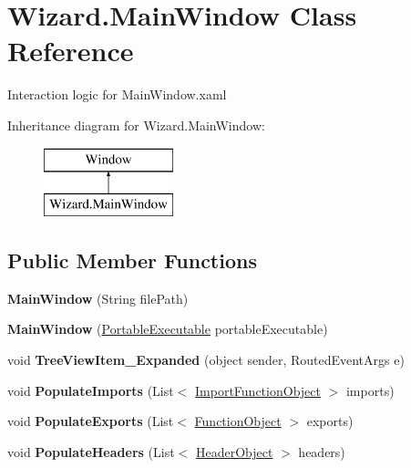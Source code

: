 \hypertarget{class_wizard_1_1_main_window}{}\section{Wizard.\+Main\+Window Class Reference}
\label{class_wizard_1_1_main_window}


Interaction logic for Main\+Window.\+xaml  


Inheritance diagram for Wizard.\+Main\+Window\+:\begin{figure}[H]
\begin{center}
\leavevmode
\includegraphics[height=2.000000cm]{class_wizard_1_1_main_window}
\end{center}
\end{figure}
\subsection*{Public Member Functions}
\begin{DoxyCompactItemize}
\item 
\mbox{\label{class_wizard_1_1_main_window_ad88b092b55742a7c3ab9f24acdc84f70}} 
{\bfseries Main\+Window} (String file\+Path)
\item 
\mbox{\label{class_wizard_1_1_main_window_a049459edae54d9aff0ece0fbf9431a35}} 
{\bfseries Main\+Window} (\mbox{\hyperlink{class_p_e_d_scanner_lib_1_1_core_1_1_portable_executable}{Portable\+Executable}} portable\+Executable)
\item 
\mbox{\label{class_wizard_1_1_main_window_ae8d6062a995d86d235408f051ff48bfb}} 
void {\bfseries Tree\+View\+Item\+\_\+\+Expanded} (object sender, Routed\+Event\+Args e)
\item 
\mbox{\label{class_wizard_1_1_main_window_a4ab7c3c6ceb6642c122dd0c32a65c2f6}} 
void {\bfseries Populate\+Imports} (List$<$ \mbox{\hyperlink{class_objects_1_1_import_function_object}{Import\+Function\+Object}} $>$ imports)
\item 
\mbox{\label{class_wizard_1_1_main_window_a4420d6f60644433b6bba116896125f55}} 
void {\bfseries Populate\+Exports} (List$<$ \mbox{\hyperlink{class_objects_1_1_function_object}{Function\+Object}} $>$ exports)
\item 
\mbox{\label{class_wizard_1_1_main_window_ac3a622330963376c3f4219bb5cdda623}} 
void {\bfseries Populate\+Headers} (List$<$ \mbox{\hyperlink{class_p_e_d_scanner_lib_1_1_objects_1_1_header_object}{Header\+Object}} $>$ headers)
\end{DoxyCompactItemize}

